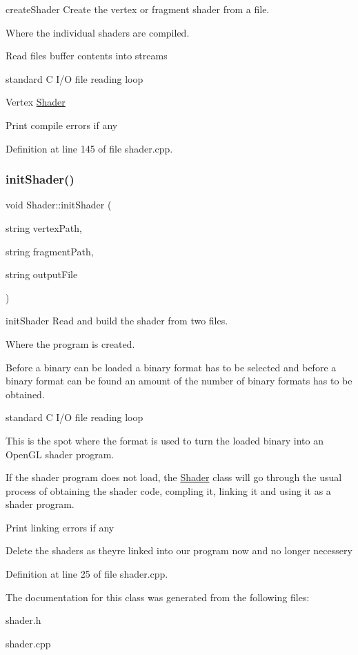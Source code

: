 create\+Shader Create the vertex or fragment shader from a file. 

Where the individual shaders are compiled.

Read file\textquotesingle{}s buffer contents into streams

standard C I/O file reading loop

Vertex \hyperlink{classShader}{Shader}

Print compile errors if any 

Definition at line 145 of file shader.\+cpp.

\mbox{\label{classShader_af73d7e0d84dcdcfe0beb871ac796928c}} 
\subsubsection{\texorpdfstring{init\+Shader()}{initShader()}}
{\footnotesize\ttfamily void Shader\+::init\+Shader (\begin{DoxyParamCaption}\item[{string}]{vertex\+Path,  }\item[{string}]{fragment\+Path,  }\item[{string}]{output\+File }\end{DoxyParamCaption})}



init\+Shader Read and build the shader from two files. 

Where the program is created.

Before a binary can be loaded a binary format has to be selected and before a binary format can be found an amount of the number of binary formats has to be obtained.

standard C I/O file reading loop

This is the spot where the format is used to turn the loaded binary into an Open\+GL shader program.

If the shader program does not load, the \hyperlink{classShader}{Shader} class will go through the usual process of obtaining the shader code, compling it, linking it and using it as a shader program.

Print linking errors if any

Delete the shaders as they\textquotesingle{}re linked into our program now and no longer necessery 

Definition at line 25 of file shader.\+cpp.



The documentation for this class was generated from the following files\+:\begin{DoxyCompactItemize}
\item 
shader.\+h\item 
shader.\+cpp\end{DoxyCompactItemize}
